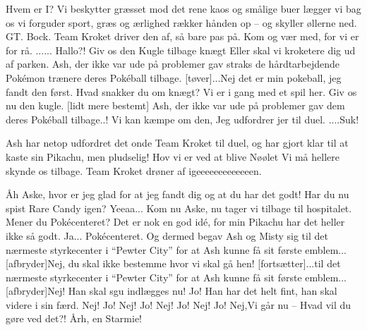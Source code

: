\documentclass[a4paper,11pt]{article}
\begin{document}
\begin{sketch}
 Hvem er I?
 Vi beskytter græsset mod det rene kaos
 og smålige buer lægger vi bag os
 vi forguder sport, græs og ærlighed
rækker hånden op – og skyller øllerne ned.
GT.
Bock.
Team Kroket driver den af, så bare pas på. Kom og vær med, for vi er for rå.
 ...... Hallo?!
 Giv os den Kugle tilbage knægt
 Eller skal vi kroketere dig ud af parken.
 Ash, der ikke var ude på problemer gav straks de hårdtarbejdende Pokémon trænere deres Pokéball tilbage.
[tøver]...Nej det er min pokeball, jeg fandt den først.
 Hvad snakker du om knægt?
 Vi er i gang med et spil her.
 Giv os nu den kugle.
[lidt mere bestemt] Ash, der ikke var ude på problemer gav dem deres Pokéball tilbage..!
 Vi kan kæmpe om den, Jeg udfordrer jer til duel.
 ....Suk!

 Ash har netop udfordret det onde Team Kroket til duel, og har gjort klar til at kaste sin Pikachu, men pludselig!
 Hov vi er ved at blive Nøølet  Vi må hellere skynde os tilbage.
 Team Kroket drøner af igeeeeeeeeeeeeen.


Åh Aske, hvor er jeg glad for at jeg fandt dig og at du har det godt! Har du nu spist Rare Candy igen?
Yeeaa...
Kom nu Aske, nu tager vi tilbage til hospitalet.
Mener du Pokécenteret? Det er nok en god idé, for min Pikachu har det heller ikke så godt.
Ja... Pokécenteret.
Og dermed begav Ash og Misty sig til det nærmeste styrkecenter i “Pewter City” for at Ash kunne få sit første emblem...
[afbryder]Nej, du skal ikke bestemme hvor vi skal gå hen!
[fortsætter]...til det nærmeste styrkecenter i “Pewter City” for at Ash kunne få sit første emblem...
[afbryder]Nej! Han skal sgu indlægges nu!
Jo! Han har det helt fint, han skal videre i sin færd.
Nej!
Jo!
Nej!
Jo!
Nej!
Jo!
Nej!
Jo!
Nej,Vi går nu -- Hvad vil du gøre ved det?!
Årh, en Starmie!


\end{sketch}
\end{document}
